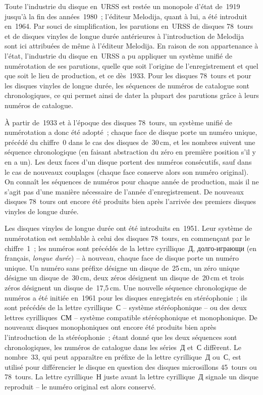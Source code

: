 Toute l'industrie du disque en~URSS est restée un monopole d'état de~1919
jusqu'à la fin des années~1980~; l'éditeur Melodija, quant à lui, a été
introduit en~1964.
Par souci de simplification, les parutions en~URSS de disques 78~tours et de
disques vinyles de longue durée antérieures à l'introduction de Melodija
sont ici attribuées de même à l'éditeur Melodija.
En raison de son appartenance à l'état, l'industrie du disque en~URSS a pu
appliquer un système unifié de numérotation de ses parutions, quelle que
soit l'origine de l'enregistrement et quel que soit le lieu de production,
et ce dès~1933.
Pour les disques 78~tours et pour les disques vinyles de longue durée, les
séquences de numéros de catalogue sont chronologiques, ce qui permet ainsi
de dater la plupart des parutions grâce à leurs numéros de catalogue.

À partir de~1933 et à l'époque des disques 78~tours, un système unifié de
numérotation a donc été adopté~; chaque face de disque porte un numéro
unique, précédé du chiffre~0 dans le cas des disques de~30\,cm, et les
nombres suivent une séquence chronologique (en faisant abstraction du zéro
en première position s'il y en a un).
Les deux faces d'un disque portent des numéros consécutifs, sauf dans le cas
de nouveaux couplages (chaque face conserve alors son numéro original).
On connaît les séquences de numéros pour chaque année de production, mais il
ne s'agit pas d'une manière nécessaire de l'année d'enregistrement.
De nouveaux disques 78~tours ont encore été produits bien après l'arrivée
des premiers disques vinyles de longue durée.

Les disques vinyles de longue durée ont été introduits en~1951.
Leur système de numérotation est semblable à celui des disques 78~tours, en
commençant par le chiffre~1~; les numéros sont précédés de la lettre
cyrillique~\foreignlanguage{russian}{Д}, \cad \foreignlanguage{russian}
{долго-играющи} (en français, \emph{longue durée}) -- à nouveau, chaque face
de disque porte un numéro unique.
Un numéro sans préfixe désigne un disque de~25\,cm, un zéro unique désigne
un disque de~30\,cm, deux zéros désignent un disque de~20\,cm et trois zéros
désignent un disque de~17,5\,cm.
Une nouvelle séquence chronologique de numéros a été initiée en~1961 pour
les disques enregistrés en stéréophonie~; ils sont précédés de la lettre
cyrillique~\foreignlanguage{russian}{С} -- système stéréophonique -- ou des
deux lettres cyrilliques~\foreignlanguage{russian}{СМ} -- système compatible
stéréophonique et monophonique.
De nouveaux disques monophoniques ont encore été produits bien après
l'introduction de la stéréophonie~; étant donné que les deux séquences sont
chronologiques, les numéros de catalogue dans les
séries~\foreignlanguage{russian}{Д} et~\foreignlanguage{russian}{С}
diffèrent.
Le nombre~33, qui peut apparaître en préfixe de la lettre
cyrillique~\foreignlanguage{russian}{Д} ou~\foreignlanguage{russian}{С}, est
utilisé pour différencier le disque en question des disques microsillons
45~tours ou 78~tours.
La lettre cyrillique~\foreignlanguage{russian}{Н} juste avant la lettre
cyrillique~\foreignlanguage{russian}{Д} signale un disque reproduit -- le
numéro original est alors conservé.

